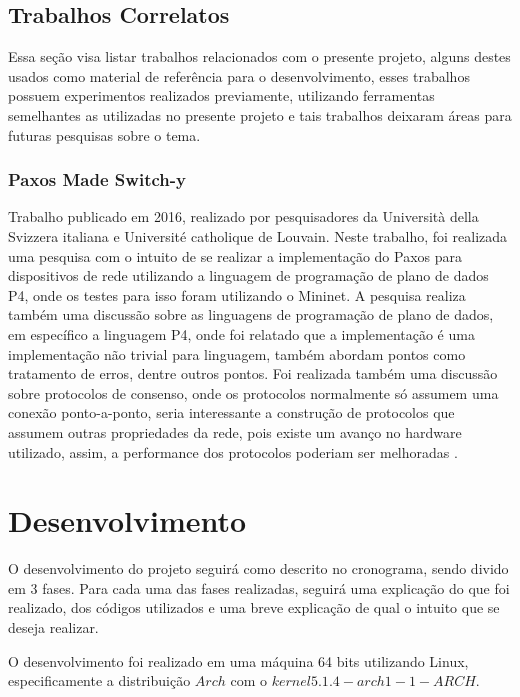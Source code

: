 \documentclass[
    12pt,
    openright, 
    oneside,
    a4paper,
    french,
    english,
    brazil
    ]{facom-ufu-abntex2}
\theoremstyle{definition}
\begin{document}
\section{Trabalhos Correlatos}
Essa seção visa listar trabalhos relacionados com o presente projeto, alguns destes usados
como material de referência para o desenvolvimento, esses trabalhos possuem experimentos
realizados previamente, utilizando ferramentas semelhantes as utilizadas no presente projeto 
e tais trabalhos deixaram áreas para futuras pesquisas sobre o tema.

\subsection{Paxos Made Switch-y}
Trabalho publicado em 2016, realizado por pesquisadores da Università della Svizzera italiana
e Université catholique de Louvain. Neste trabalho, foi realizada uma pesquisa com o intuito
de se realizar a implementação do Paxos para dispositivos de rede utilizando a linguagem
de programação de plano de dados P4, onde os testes para isso foram utilizando o Mininet. 
A pesquisa realiza também uma discussão sobre as linguagens de programação de plano de dados,
em específico a linguagem P4, onde foi relatado que a implementação é uma
implementação não trivial para linguagem, também abordam pontos como tratamento de erros,
dentre outros pontos. Foi realizada também uma discussão sobre protocolos de consenso,
onde os protocolos normalmente só assumem uma conexão ponto-a-ponto, seria interessante a
construção de protocolos que assumem outras propriedades da rede, pois existe um avanço
no hardware utilizado, assim, a performance dos protocolos poderiam ser melhoradas 
\cite{dang2016paxos}.

\chapter{Desenvolvimento}
O desenvolvimento do projeto seguirá como descrito no cronograma, sendo divido em 
3 fases. Para cada uma das fases realizadas, seguirá uma explicação do que foi realizado,
dos códigos utilizados e uma breve explicação de qual o intuito que se deseja realizar.

O desenvolvimento foi realizado em uma máquina 64 bits utilizando Linux, especificamente a 
distribuição $Arch$ com o $kernel 5.1.4-arch1-1-ARCH$.
\end{document}

